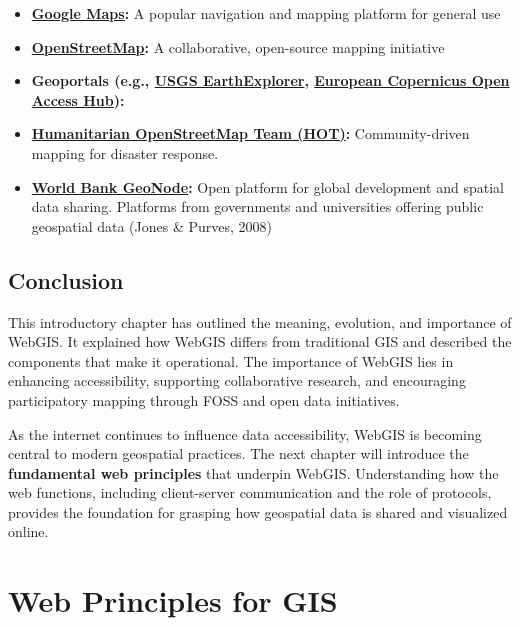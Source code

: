\documentclass[
  11pt,
  letterpaper,
]{book}
\providecommand{\tightlist}{%
  \setlength{\itemsep}{0pt}\setlength{\parskip}{0pt}}
\begin{document}
\begin{itemize}
\tightlist
\item
  \textbf{\href{https://maps.google.com}{Google Maps}:} A popular
  navigation and mapping platform for general use\\
\item
  \textbf{\href{https://www.openstreetmap.org}{OpenStreetMap}:} A
  collaborative, open-source mapping initiative\\
\item
  \textbf{Geoportals (e.g., \href{https://earthexplorer.usgs.gov/}{USGS
  EarthExplorer}, \href{https://scihub.copernicus.eu/}{European
  Copernicus Open Access Hub}):}\\
\item
  \textbf{\href{https://www.hotosm.org/}{Humanitarian OpenStreetMap Team
  (HOT)}:} Community-driven mapping for disaster response.\\
\item
  \textbf{\href{https://geonode.worldbank.org/}{World Bank GeoNode}:}
  Open platform for global development and spatial data sharing.
  Platforms from governments and universities offering public geospatial
  data (Jones \& Purves, 2008)
\end{itemize}

\section{Conclusion}\label{conclusion-6}

This introductory chapter has outlined the meaning, evolution, and
importance of WebGIS. It explained how WebGIS differs from traditional
GIS and described the components that make it operational. The
importance of WebGIS lies in enhancing accessibility, supporting
collaborative research, and encouraging participatory mapping through
FOSS and open data initiatives.

As the internet continues to influence data accessibility, WebGIS is
becoming central to modern geospatial practices. The next chapter will
introduce the \textbf{fundamental web principles} that underpin WebGIS.
Understanding how the web functions, including client-server
communication and the role of protocols, provides the foundation for
grasping how geospatial data is shared and visualized online.

\chapter{Web Principles for GIS}\label{web-principles-for-gis}
\end{document}
